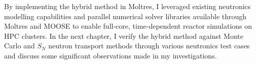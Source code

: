 By implementing the hybrid method in Moltres, I leveraged existing neutronics modelling
capabilities and parallel numerical solver libraries available through Moltres and \gls{MOOSE} to
enable full-core, time-dependent reactor simulations on \gls{HPC} clusters.
In the next chapter, I verify the hybrid method against Monte Carlo and $S_N$ neutron transport
methods through various neutronics test cases and discuss some significant observations made in my
investigations.
